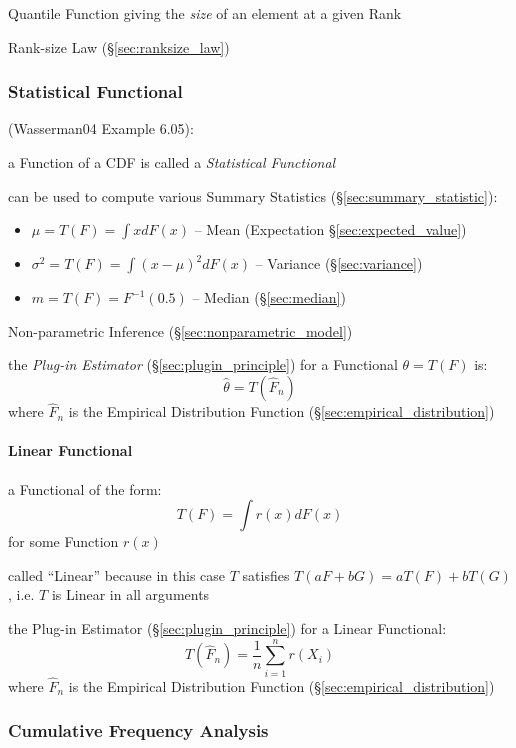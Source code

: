 Quantile Function giving the \emph{size} of an element at a given Rank

\fist Rank-size Law (\S\ref{sec:ranksize_law})



\subsubsection{Statistical Functional}\label{sec:statistical_functional}

(Wasserman04 Example 6.05):

a Function of a CDF is called a \emph{Statistical Functional}

can be used to compute various Summary Statistics
(\S\ref{sec:summary_statistic}):
\begin{itemize}
  \item $\mu = T(F) = \int x dF(x)$
    -- Mean (Expectation \S\ref{sec:expected_value})
  \item $\sigma^2 = T(F) = \int (x - \mu)^2 dF(x)$
    -- Variance (\S\ref{sec:variance})
  \item $m = T(F) = F^{-1}(0.5)$
    -- Median (\S\ref{sec:median})
\end{itemize}

Non-parametric Inference (\S\ref{sec:nonparametric_model})

the \emph{Plug-in Estimator} (\S\ref{sec:plugin_principle}) for a Functional
$\theta = T(F)$ is:
\[
  \hat{\theta} = T(\hat{F}_n)
\]
where $\hat{F}_n$ is the Empirical Distribution Function
(\S\ref{sec:empirical_distribution})



\paragraph{Linear Functional}\label{sec:linear_functional}\hfill

a Functional of the form:
\[
  T(F) = \int r(x) dF(x)
\]
for some Function $r(x)$

called ``Linear'' because in this case $T$ satisfies
$T(aF + bG) = aT(F) + bT(G)$, i.e. $T$ is Linear in all arguments

the Plug-in Estimator (\S\ref{sec:plugin_principle}) for a Linear Functional:
\[
  T(\hat{F}_n) = \frac{1}{n}\sum_{i=1}^n r(X_i)
\]
where $\hat{F}_n$ is the Empirical Distribution Function
(\S\ref{sec:empirical_distribution})



\subsubsection{Cumulative Frequency Analysis}
\label{sec:cumulative_frequency_analysis}

